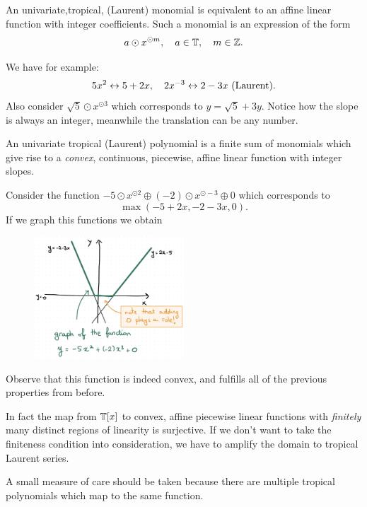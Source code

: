 \documentclass[12pt]{memoir}
\begin{document}
An univariate,tropical, (Laurent) monomial is equivalent to an affine linear function with integer coefficients. Such a monomial is an expression of the form 
$$a\odot x^{\odot m},\quad a\in\mathbb{T},\quad m\in\mathbb{Z}.$$

\begin{Ex}
    We have for example:
    $$5x^2\leftrightarrow 5+2x,\quad 2x^{-3}\leftrightarrow 2-3x\ (\text{Laurent}).$$
    Also consider $\sqrt 5\odot x^{\odot 3}$ which corresponds to $y=\sqrt{5}+3y$. Notice how the slope is always an integer, meanwhile the translation can be any number.
\end{Ex}

An univariate tropical (Laurent) polynomial is a finite sum of monomials which give rise to a \emph{convex}, continuous, piecewise, affine linear function with integer slopes. 

\begin{Ex}
    Consider the function $-5\odot x^{\odot2}\oplus(-2)\odot x^{\odot-3}\oplus 0$ which corresponds to 
    $$\max(-5+2x,-2-3x,0).$$
    If we graph this functions we obtain
    \begin{figure}[h!]
        \centering
        \includegraphics[width=0.5\textwidth]{figs/fig3-1RenzoNotes3.png}
        \label{fig:3.1-ConvPLFunc}
    \end{figure}
    Observe that this function is indeed convex, and fulfills all of the previous properties from before. 
\end{Ex}

In fact the map from $\mathbb{T}[x]$ to convex, affine piecewise linear functions with \emph{finitely} many distinct regions of linearity is surjective. If we don't want to take the finiteness condition into consideration, we have to amplify the domain to tropical Laurent series.\par 
A small measure of care should be taken because there are multiple tropical polynomials which map to the same function.
\end{document}
